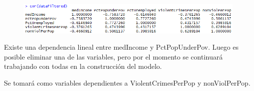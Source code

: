 \documentclass[a4paper,10pt,twocolumn]{article}
\begin{document}
		

\begin{figure}[H]
	\begin{center}
		\includegraphics[width=\columnwidth]{figures/correlation.png}
	\end{center}	
\end{figure}

Existe una dependencia lineal entre medIncome y PctPopUnderPov. Luego es posible
eliminar una de las variables, pero por el momento se continuará trabajando con todas en
la construcción del modelo.

Se tomará como variables dependientes a ViolentCrimesPerPop y nonViolPerPop.
\end{document}
